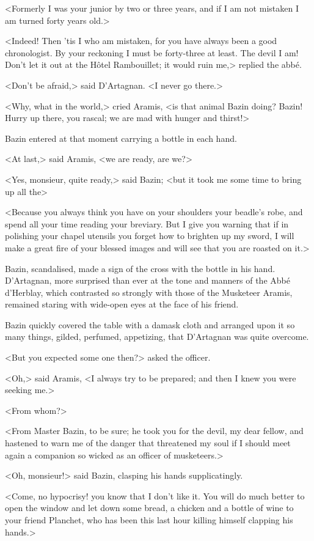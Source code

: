 <Formerly I was your junior by two or three years, and if I am not mistaken I am turned forty years old.>

<Indeed! Then 'tis I who am mistaken, for you have always been a good chronologist. By your reckoning I must be forty-three at least. The devil I am! Don't let it out at the Hôtel Rambouillet; it would ruin me,> replied the abbé.

<Don't be afraid,> said D'Artagnan. <I never go there.>

<Why, what in the world,> cried Aramis, <is that animal Bazin doing? Bazin! Hurry up there, you rascal; we are mad with hunger and thirst!>

Bazin entered at that moment carrying a bottle in each hand.

<At last,> said Aramis, <we are ready, are we?>

<Yes, monsieur, quite ready,> said Bazin; <but it took me some time to bring up all the\longdash>

<Because you always think you have on your shoulders your beadle's robe, and spend all your time reading your breviary. But I give you warning that if in polishing your chapel utensils you forget how to brighten up my sword, I will make a great fire of your blessed images and will see that you are roasted on it.>

Bazin, scandalised, made a sign of the cross with the bottle in his hand. D'Artagnan, more surprised than ever at the tone and manners of the Abbé d'Herblay, which contrasted so strongly with those of the Musketeer Aramis, remained staring with wide-open eyes at the face of his friend.

Bazin quickly covered the table with a damask cloth and arranged upon it so many things, gilded, perfumed, appetizing, that D'Artagnan was quite overcome.

<But you expected some one then?> asked the officer.

<Oh,> said Aramis, <I always try to be prepared; and then I knew you were seeking me.>

<From whom?>

<From Master Bazin, to be sure; he took you for the devil, my dear fellow, and hastened to warn me of the danger that threatened my soul if I should meet again a companion so wicked as an officer of musketeers.>

<Oh, monsieur!> said Bazin, clasping his hands supplicatingly.

<Come, no hypocrisy! you know that I don't like it. You will do much better to open the window and let down some bread, a chicken and a bottle of wine to your friend Planchet, who has been this last hour killing himself clapping his hands.>

